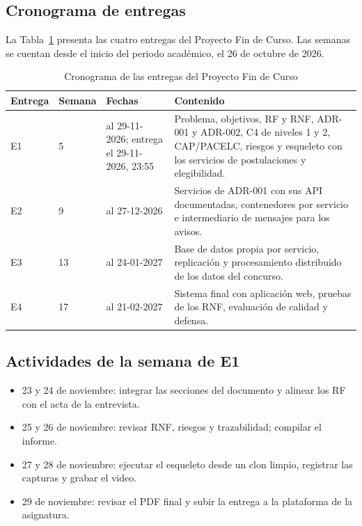 \subsection{Cronograma de entregas}
La Tabla~\ref{tab:cronograma} presenta las cuatro entregas del Proyecto Fin de Curso. Las semanas se cuentan desde el inicio del periodo académico, el 26 de octubre de 2026.

\begin{table}[htbp]
\centering\small
\caption{Cronograma de las entregas del Proyecto Fin de Curso}
\label{tab:cronograma}
\begin{tabularx}{\textwidth}{@{}p{1.7cm}p{1.7cm}>{\raggedright\arraybackslash}p{3.0cm}>{\raggedright\arraybackslash}X@{}}
\toprule
\textbf{Entrega} & \textbf{Semana} & \textbf{Fechas} & \textbf{Contenido}\\
\midrule
E1 & 5 & 23 al 29-11-2026; entrega el 29-11-2026, 23:55 & Problema, objetivos, RF y RNF, ADR-001 y ADR-002, C4 de niveles 1 y 2, CAP/PACELC, riesgos y esqueleto con los servicios de postulaciones y elegibilidad.\\
\addlinespace
E2 & 9 & 21 al 27-12-2026 & Servicios de ADR-001 con sus API documentadas, contenedores por servicio e intermediario de mensajes para los avisos.\\
\addlinespace
E3 & 13 & 18 al 24-01-2027 & Base de datos propia por servicio, replicación y procesamiento distribuido de los datos del concurso.\\
\addlinespace
E4 & 17 & 15 al 21-02-2027 & Sistema final con aplicación web, pruebas de los RNF, evaluación de calidad y defensa.\\
\bottomrule
\end{tabularx}
\end{table}

\subsection{Actividades de la semana de E1}
\begin{itemize}
  \item 23 y 24 de noviembre: integrar las secciones del documento y alinear los RF con el acta de la entrevista.
  \item 25 y 26 de noviembre: revisar RNF, riesgos y trazabilidad; compilar el informe.
  \item 27 y 28 de noviembre: ejecutar el esqueleto desde un clon limpio, registrar las capturas y grabar el video.
  \item 29 de noviembre: revisar el PDF final y subir la entrega a la plataforma de la asignatura.
\end{itemize}

